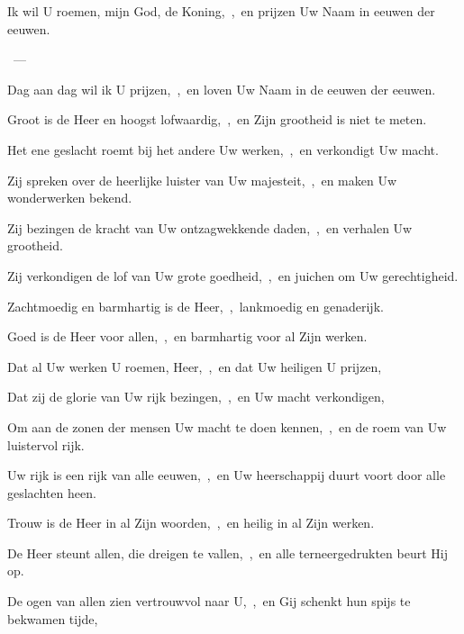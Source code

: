 \documentclass[12pt,twoside,a5paper]{article}
\begin{document}
\begin{halfparskip}
   
\end{halfparskip}

\begin{halfparskip}
   
\end{halfparskip}

\begin{halfparskip}
   Ik wil U roemen, mijn God, de Koning,~\sep\ en prijzen Uw Naam in eeuwen der eeuwen.

  ~--- 

  Dag aan dag wil ik U prijzen,~\sep\ en loven Uw Naam in de eeuwen der eeuwen.

  Groot is de Heer en hoogst lofwaardig,~\sep\ en Zijn grootheid is niet te meten.

  Het ene geslacht roemt bij het andere Uw werken,~\sep\ en verkondigt Uw macht.

  Zij spreken over de heerlijke luister van Uw majesteit,~\sep\ en maken Uw wonderwerken bekend.

  Zij bezingen de kracht van Uw ontzagwekkende daden,~\sep\ en verhalen Uw grootheid.

  Zij verkondigen de lof van Uw grote goedheid,~\sep\ en juichen om Uw gerechtigheid.

  Zachtmoedig en barmhartig is de Heer,~\sep\ lankmoedig en genaderijk.

  Goed is de Heer voor allen,~\sep\ en barmhartig voor al Zijn werken.

  Dat al Uw werken U roemen, Heer,~\sep\ en dat Uw heiligen U prijzen,

  Dat zij de glorie van Uw rijk bezingen,~\sep\ en Uw macht verkondigen,

  Om aan de zonen der mensen Uw macht te doen kennen,~\sep\ en de roem van Uw luistervol rijk.

  Uw rijk is een rijk van alle eeuwen,~\sep\ en Uw heerschappij duurt voort door alle geslachten heen.

  Trouw is de Heer in al Zijn woorden,~\sep\ en heilig in al Zijn werken.

  De Heer steunt allen, die dreigen te vallen,~\sep\ en alle terneergedrukten beurt Hij op.

  De ogen van allen zien vertrouwvol naar U,~\sep\ en Gij schenkt hun spijs te bekwamen tijde,


\end{halfparskip}
\end{document}
